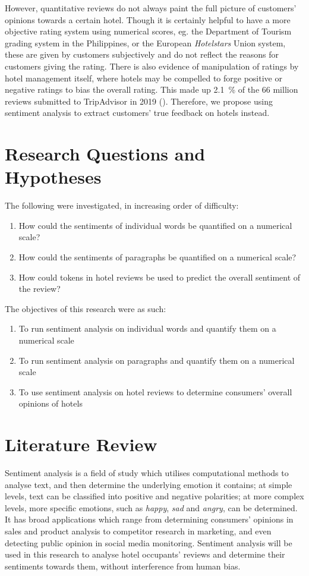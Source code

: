 \documentclass[11pt, a4paper]{pancake-article}
\begin{document}
However, quantitative reviews do not always paint the full picture of customers'
opinions towards a certain hotel. Though it is certainly helpful to have a more
objective rating system using numerical scores, eg. the Department of Tourism
grading system in the Philippines, or the European \textit{Hotelstars} Union system,
these are given by customers subjectively and do not reflect the reasons for
customers giving the rating. There is also evidence of manipulation of ratings
by hotel management itself, where hotels may be compelled to forge positive or
negative ratings to bias the overall rating. This made up \qty{2.1}{\percent}
of the 66 million reviews submitted to TripAdvisor in 2019 (\cite{tripadvisor}).
Therefore, we propose using sentiment analysis to extract customers' true
feedback on hotels instead.

\section{Research Questions and Hypotheses}
The following were investigated, in increasing order of difficulty:
\begin{enumerate}
	\item How could the sentiments of individual words be quantified on a numerical scale?
	\item How could the sentiments of paragraphs be quantified on a numerical scale?
	\item How could tokens in hotel reviews be used to predict the overall sentiment of the review?
\end{enumerate}

The objectives of this research were as such:
\begin{enumerate}
	\item To run sentiment analysis on individual words and quantify them on a numerical scale
	\item To run sentiment analysis on paragraphs and quantify them on a numerical scale
	\item To use sentiment analysis on hotel reviews to determine consumers' overall opinions of hotels
\end{enumerate}

\section{Literature Review}
Sentiment analysis is a field of study which utilises computational methods to analyse text,
and then determine the underlying emotion it contains; at simple levels, text can be classified
into positive and negative polarities; at more complex levels, more specific emotions, such as
\textit{happy}, \textit{sad} and \textit{angry}, can be determined. It
has broad applications which range from determining consumers' opinions in sales and product
analysis to competitor research in marketing, and even detecting public opinion in social media
monitoring. Sentiment analysis will be used in this research to analyse hotel occupants' reviews
and determine their sentiments towards them, without interference from human bias.
\end{document}
